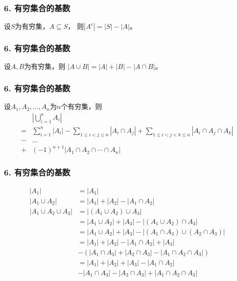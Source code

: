 \documentclass{beamer}
\begin{document}
\begin{CJK*}{UTF8}{gbsn}
\begin{frame}
\frametitle{6. 有穷集合的基数}
\begin{Thm}
  设$S$为有穷集，$A \subseteq S$， 则$|A^c| = |S| - |A|$。
\end{Thm}
\end{frame}

\begin{frame}
\frametitle{6. 有穷集合的基数}
\begin{Thm}
  设$A,B$为有穷集，则
$|A \cup B| = |A| + |B| - |A \cap B|$。
\end{Thm}\pause
\end{frame}
\begin{frame}
  \frametitle{6. 有穷集合的基数}
\begin{Thm}
  设$A_1, A_2, \ldots, A_n$为$n$个有穷集，则
  \begin{equation*}
\begin{split}
    &|\bigcup_{i=1}^nA_i|\\
=&\sum_{i=1}^n|A_i| - \sum_{1\leq i < j \leq n}|A_i \cap A_j| + \sum_{1 \leq  i < j < k \leq n}|A_i \cap A_j \cap A_k|\\
-&\ldots\\
+&(-1)^{n+1}|A_1 \cap A_2 \cap \cdots \cap A_n| 
  \end{split}
\end{equation*}
\end{Thm}
\end{frame}
\begin{frame}
  \frametitle{6. 有穷集合的基数}
  \begin{align*}
    |A_1|&=|A_1|\\ 
    |A_1\cup A_2|&=|A_1|+|A_2|-|A_1\cap A_2|\\ 
    |A_1\cup A_2\cup A_3|&=|(A_1\cup A_2)\cup A_3|\\
         &=|A_1\cup A_2| + |A_3| - |(A_1\cup A_2)\cap A_3|\\
             &=|A_1\cup A_2| + |A_3| - |(A_1\cap A_3) \cup (A_2 \cap A_3)|\\
         &=|A_1| + |A_2| - |A_1\cap A_2| + |A_3|\\
         &-(|A_1\cap A_3| + |A_2 \cap A_3| - |A_1\cap A_2 \cap A_3|)\\
         &=|A_1| + |A_2| + |A_3| - |A_1\cap A_2|\\
             &-|A_1\cap A_3| - |A_2 \cap A_3| + |A_1\cap A_2 \cap A_3|\\
  \end{align*}
\end{frame}


\end{CJK*}
\end{document}
